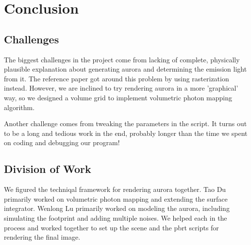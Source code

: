 \documentclass[10pt,a4paper]{article}
\begin{document}
\section{Conclusion}

\subsection{Challenges}

The biggest challenges in the project come from lacking of complete, physically plausible explanation about generating aurora and determining the emission light from it. The reference paper got around this problem by using rasterization instead. However, we are inclined to try rendering aurora in a more 'graphical' way, so we designed a volume grid to implement volumetric photon mapping algorithm.

Another challenge comes from tweaking the parameters in the script. It turns out to be a long and tedious work in the end, probably longer than the time we spent on coding and debugging our program!

\subsection{Division of Work}

We figured the techniqal framework for rendering aurora together. Tao Du primarily worked on volumetric photon mapping and extending the surface integrator. Wenlong Lu primarily worked on modeling the aurora, including simulating the footprint and adding multiple noises. We helped each in the process and worked together to set up the scene and the pbrt scripts for rendering the final image.  



\end{document}
